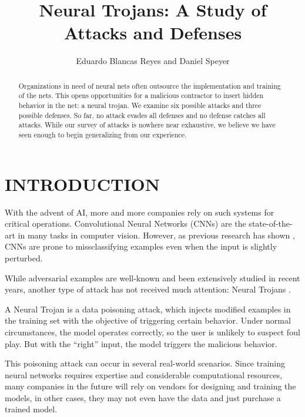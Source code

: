 \documentclass[letterpaper, 10 pt, conference]{ieeeconf}  %
\title{\LARGE \bf
Neural Trojans: A Study of Attacks and Defenses
}
\author{Eduardo Blancas Reyes and Daniel Speyer%
}
\begin{document}
\maketitle
\thispagestyle{empty}
\pagestyle{empty}


\begin{abstract}

Organizations in need of neural nets often outsource the
implementation and training of the nets.  This opens opportunities for
a malicious contractor to insert hidden behavior in the net: a neural
trojan.  We examine six possible attacks and three possible defenses.
So far, no attack evades all defenses and no defense catches all
attacks.  While our survey of attacks is nowhere near exhaustive, we
believe we have seen enough to begin generalizing from our experience.
  
\end{abstract}


\section{INTRODUCTION}

With the advent of AI, more and more companies rely on such systems for critical operations. Convolutional Neural Networks (CNNs) are the state-of-the-art in many tasks in computer vision. However, as previous research has shown \cite{adversarial, adversarial2}, CNNs are prone to missclassifying examples even when the input is slightly perturbed.

While adversarial examples are well-known and been extensively studied in recent years, another type of attack has not received much attention: Neural Trojans \cite{trojan, trojan2}.

A Neural Trojan is a data poisoning attack, which injects modified examples in the training set with the objective of triggering certain behavior.  Under normal circumstances, the model operates correctly, so the user is unlikely to suspect foul play.  But with the ``right'' input, the model triggers the malicious behavior.

This poisoning attack can occur in several real-world scenarios. Since training neural networks requires expertise and considerable computational resources, many companies in the future will rely on vendors for designing and training the models, in other cases, they may not even have the data and just purchase a trained model.
\end{document}
